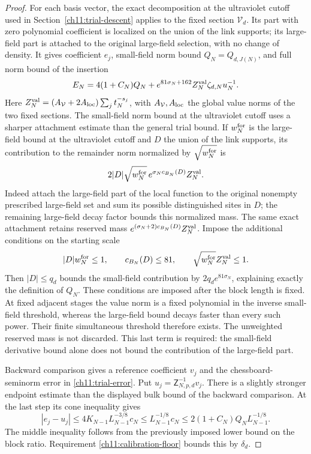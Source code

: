 \begin{proof}
For each basis vector, the exact decomposition at the ultraviolet cutoff used in
Section~\ref{ch11:trial-descent} applies to the fixed section
$\mathcal V_d$. Its part with zero polynomial coefficient is localized on the union of the
link supports; its large-field part is attached to the original
large-field selection, with no change of density.
It gives coefficient $e_j$, small-field norm bound
$Q_N=Q_{d,J(N)}$, and full norm bound of the insertion
\[
 E_N=4(1+C_N)Q_N+
 e^{81\sigma_N+162}Z_N^{\rm val}\zeta_{d,N}u_N^{-1}.
\]
Here
$Z_N^{\rm val}=(A_{\mathcal V}+2A_{\rm loc})
 \sum_jt_N^{-s_j}$, with $A_{\mathcal V},A_{\rm loc}$
the global value norms of the two fixed sections.
The small-field norm bound at the ultraviolet cutoff uses a sharper attachment estimate
than the general trial bound. If $w_N^{\rm for}$ is the large-field bound at the
ultraviolet cutoff and $D$ the union of the link supports, its contribution
to the remainder norm normalized by $\sqrt{w_N^{\rm for}}$ is
\[
 2|D|\sqrt{w_N^{\rm for}}\,
       e^{\sigma_N c_{B_N}(D)}Z_N^{\rm val}.
\]
Indeed attach the large-field part of the local function to the original
nonempty prescribed large-field set and sum its possible distinguished
sites in $D$; the remaining large-field decay factor bounds this
normalized mass. The same exact attachment retains reserved mass
$e^{(\sigma_N+2)c_{B_N}(D)}Z_N^{\rm val}$.
Impose the additional conditions on the starting scale
\[
 |D|w_N^{\rm for}\le1,\qquad c_{B_N}(D)\le81,\qquad
 \sqrt{w_N^{\rm for}}Z_N^{\rm val}\le1.
\]
Then $|D|\le q_d$ bounds the small-field contribution by
$2q_de^{81\sigma_N}$, explaining exactly the definition of $Q_N$.
These conditions are imposed after the block length is fixed. At fixed adjacent
stages the value norm is a fixed polynomial in the inverse
small-field threshold, whereas the large-field bound decays
faster than every such power. Their finite simultaneous threshold
therefore exists. The unweighted reserved mass is not discarded.
This last term is required: the small-field derivative bound alone
does not bound the contribution of the large-field part.

Backward comparison gives a reference coefficient $v_j$ and the
chessboard-seminorm error in \eqref{ch11:trial-error}. Put
$u_j=\mathsf Z_{N,p,d}^{-1}v_j$.
There is a slightly stronger endpoint estimate than the displayed
bulk bound of the backward comparison. At the last step its cone inequality gives
\[
 |e_j-u_j|\le
 4K_{N-1}L_{N-1}^{-3/8}c_N
 \le L_{N-1}^{-1/8}c_N
 \le 2(1+C_N)Q_N L_{N-1}^{-1/8}.
\]
The middle inequality follows from the previously imposed lower
bound on the block ratio. Requirement \eqref{ch11:calibration-floor} bounds this by
$\delta_d$.


\end{proof}
